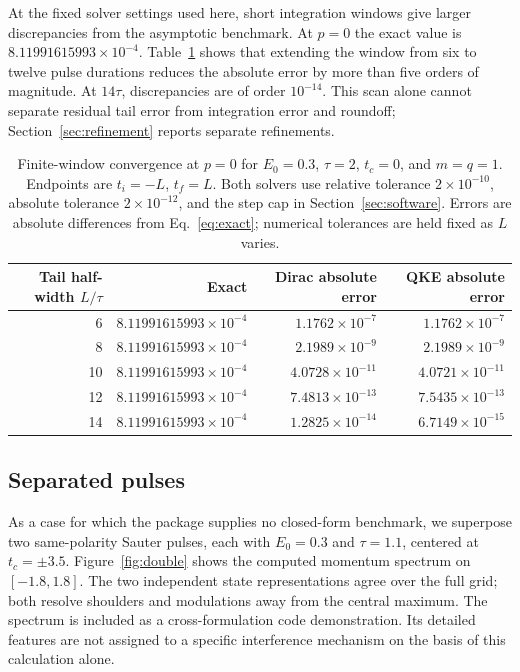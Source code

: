 \documentclass[a4paper,fleqn]{cas-dc}
\begin{document}
At the fixed solver settings used here, short integration windows give larger discrepancies from the asymptotic benchmark. At $p=0$ the exact value is $8.11991615993\times10^{-4}$. Table~\ref{tab:tail} shows that extending the window from six to twelve pulse durations reduces the absolute error by more than five orders of magnitude. At $14\tau$, discrepancies are of order $10^{-14}$. This scan alone cannot separate residual tail error from integration error and roundoff; Section~\ref{sec:refinement} reports separate refinements.

\begin{table}[pos=tp]
  \centering
  \small
  \caption{Finite-window convergence at $p=0$ for $E_0=0.3$, $\tau=2$, $t_c=0$, and $m=q=1$. Endpoints are $t_i=-L$, $t_f=L$. Both solvers use relative tolerance $2\times10^{-10}$, absolute tolerance $2\times10^{-12}$, and the step cap in Section~\ref{sec:software}. Errors are absolute differences from Eq.~\eqref{eq:exact}; numerical tolerances are held fixed as $L$ varies.}
  \label{tab:tail}
  \begin{tabular}{rrrr}
    \toprule
    Tail half-width $L/\tau$ & Exact & Dirac absolute error & QKE absolute error\\
    \midrule
    6  & $8.11991615993\times10^{-4}$ & $1.1762\times10^{-7}$ & $1.1762\times10^{-7}$\\
    8  & $8.11991615993\times10^{-4}$ & $2.1989\times10^{-9}$ & $2.1989\times10^{-9}$\\
    10 & $8.11991615993\times10^{-4}$ & $4.0728\times10^{-11}$ & $4.0721\times10^{-11}$\\
    12 & $8.11991615993\times10^{-4}$ & $7.4813\times10^{-13}$ & $7.5435\times10^{-13}$\\
    14 & $8.11991615993\times10^{-4}$ & $1.2825\times10^{-14}$ & $6.7149\times10^{-15}$\\
    \bottomrule
  \end{tabular}
\end{table}

\subsection{Separated pulses}

As a case for which the package supplies no closed-form benchmark, we superpose two same-polarity Sauter pulses, each with $E_0=0.3$ and $\tau=1.1$, centered at $t_c=\pm3.5$. Figure~\ref{fig:double} shows the computed momentum spectrum on $[-1.8,1.8]$. The two independent state representations agree over the full grid; both resolve shoulders and modulations away from the central maximum. The spectrum is included as a cross-formulation code demonstration. Its detailed features are not assigned to a specific interference mechanism on the basis of this calculation alone.
\end{document}
